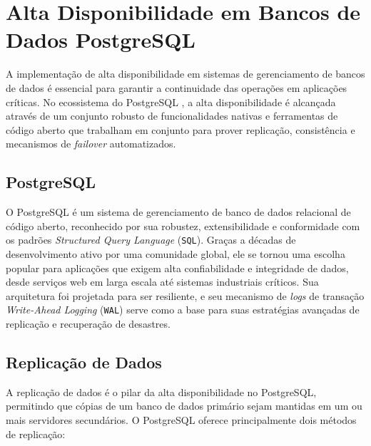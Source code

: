 \section{Alta Disponibilidade em Bancos de Dados PostgreSQL}

    A implementação de alta disponibilidade em sistemas de gerenciamento de bancos de dados é essencial para garantir a continuidade das operações em aplicações críticas. No ecossistema do PostgreSQL \cite{postgresql_official}, a alta disponibilidade é alcançada através de um conjunto robusto de funcionalidades nativas e ferramentas de código aberto que trabalham em conjunto para prover replicação, consistência e mecanismos de \textit{failover} automatizados.

    \subsection{PostgreSQL}

        O PostgreSQL é um sistema de gerenciamento de banco de dados relacional de código aberto, reconhecido por sua robustez, extensibilidade e conformidade com os padrões \textit{Structured Query Language} (\verb|SQL|). Graças a décadas de desenvolvimento ativo por uma comunidade global, ele se tornou uma escolha popular para aplicações que exigem alta confiabilidade e integridade de dados, desde serviços web em larga escala até sistemas industriais críticos. Sua arquitetura foi projetada para ser resiliente, e seu mecanismo de \textit{logs} de transação \textit{Write-Ahead Logging} (\verb|WAL|) serve como a base para suas estratégias avançadas de replicação e recuperação de desastres.

    \subsection{Replicação de Dados}

        A replicação de dados é o pilar da alta disponibilidade no PostgreSQL, permitindo que cópias de um banco de dados primário sejam mantidas em um ou mais servidores secundários. O PostgreSQL oferece principalmente dois métodos de replicação:
        
